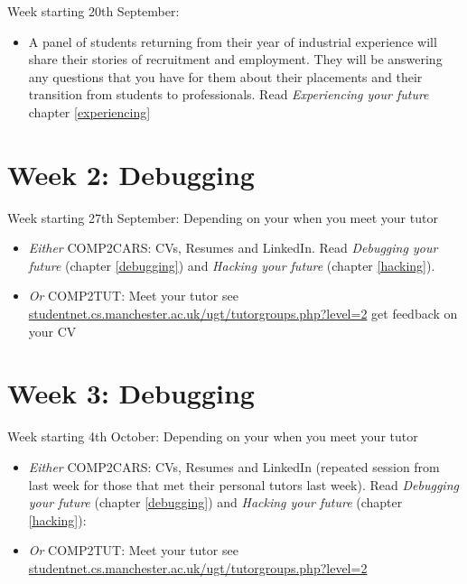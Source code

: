 \documentclass[
]{book}
\providecommand{\tightlist}{%
  \setlength{\itemsep}{0pt}\setlength{\parskip}{0pt}}
\begin{document}
Week starting 20th September:

\begin{itemize}
\tightlist
\item
  A panel of students returning from their year of industrial experience will share their stories of recruitment and employment. They will be answering any questions that you have for them about their placements and their transition from students to professionals. Read \emph{Experiencing your future} chapter \ref{experiencing}
\end{itemize}

\hypertarget{week2}{%
\section{Week 2: Debugging}\label{week2}}

Week starting 27th September: Depending on your when you meet your tutor

\begin{itemize}
\tightlist
\item
  \emph{Either} COMP2CARS: CVs, Resumes and LinkedIn. Read \emph{Debugging your future} (chapter \ref{debugging}) and \emph{Hacking your future} (chapter \ref{hacking}).
\item
  \emph{Or} COMP2TUT: Meet your tutor see \href{http://studentnet.cs.manchester.ac.uk/ugt/tutorgroups.php?level=2}{studentnet.cs.manchester.ac.uk/ugt/tutorgroups.php?level=2} get feedback on your CV
\end{itemize}

\hypertarget{week3}{%
\section{Week 3: Debugging}\label{week3}}

Week starting 4th October: Depending on your when you meet your tutor

\begin{itemize}
\tightlist
\item
  \emph{Either} COMP2CARS: CVs, Resumes and LinkedIn (repeated session from last week for those that met their personal tutors last week). Read \emph{Debugging your future} (chapter \ref{debugging}) and \emph{Hacking your future} (chapter \ref{hacking}):
\item
  \emph{Or} COMP2TUT: Meet your tutor see \href{http://studentnet.cs.manchester.ac.uk/ugt/tutorgroups.php?level=2}{studentnet.cs.manchester.ac.uk/ugt/tutorgroups.php?level=2}
\end{itemize}
\end{document}
